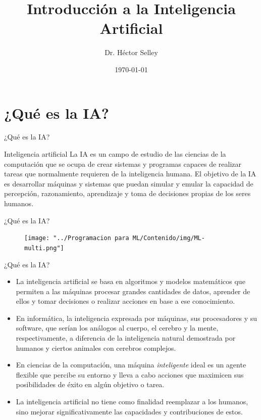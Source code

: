 \documentclass[11pt,aspectratio=169]{beamer}
\date{\today}
\author{Dr. Héctor Selley}
\institute{Universidad Anáhuac México}
\title[Introducción a la IA]{Introducción a la Inteligencia Artificial}
\begin{document}
\begin{frame}
    \titlepage
\end{frame}

\begin{frame}
 \tableofcontents
\end{frame}

\section{¿Qué es la IA?}
\begin{frame}{¿Qué es la IA?}
    \begin{block}{Inteligencia artificial}\pause
        La IA es un campo de estudio de las ciencias de 
        la computación que se ocupa de crear sistemas y programas capaces de 
        realizar tareas que normalmente requieren de la inteligencia humana. \pause
        El objetivo de la IA es desarrollar máquinas y sistemas que puedan 
        simular y emular la capacidad de percepción, razonamiento, aprendizaje 
        y toma de decisiones propias de los seres humanos.
    \end{block}
\end{frame}

\begin{frame}{¿Qué es la IA?}
    \begin{figure}
        \centering
        \texttt{[image: "../Programacion para ML/Contenido/img/ML-multi.png"]}
    \end{figure}
\end{frame}

\begin{frame}{¿Qué es la IA?}
    \begin{itemize}
        \item La inteligencia artificial se basa en algoritmos y modelos matemáticos 
            que permiten a las máquinas procesar grandes cantidades de datos, aprender 
            de ellos y tomar decisiones o realizar acciones en base a ese conocimiento. \pause
        \item En informática, la inteligencia expresada por máquinas, sus procesadores y 
            su software, que serían los análogos al cuerpo, el cerebro y la mente, 
            respectivamente, a diferencia de la inteligencia natural demostrada por humanos 
            y ciertos animales con cerebros complejos.\pause
	    \item En ciencias de la computación, una máquina \textit{inteligente} ideal es un 
            agente flexible que percibe su entorno y lleva a cabo acciones que maximicen 
            sus posibilidades de éxito en algún objetivo o tarea.\pause
        \item La inteligencia artificial no tiene como finalidad reemplazar a los humanos, 
            sino mejorar significativamente las capacidades y contribuciones de estos.  
    \end{itemize}
\end{frame}
\end{document}
